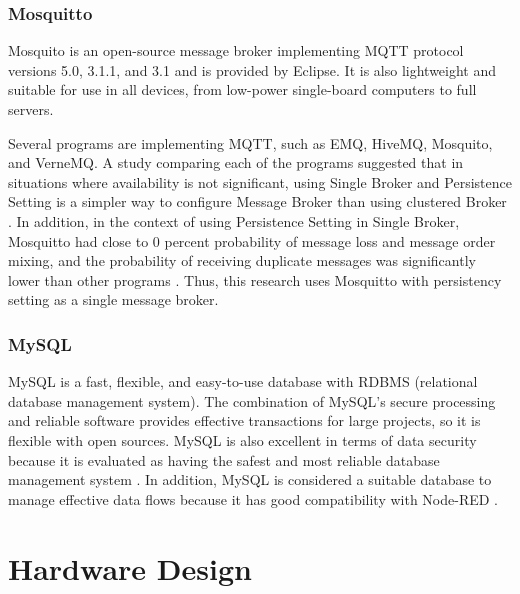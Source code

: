 \documentclass[conference]{IEEEtran}
\begin{document}
\subsubsection{Mosquitto}
Mosquito is an open-source message broker implementing MQTT protocol versions 5.0, 3.1.1, and 3.1 and is provided by Eclipse. It is also lightweight and suitable for use in all devices, from low-power single-board computers to full servers.\cite{b22}

Several programs are implementing MQTT, such as EMQ, HiveMQ, Mosquito, and VerneMQ. A study comparing each of the programs suggested that in situations where availability is not significant, using Single Broker and Persistence Setting is a simpler way to configure Message Broker than using clustered Broker \cite{b23}. In addition, in the context of using Persistence Setting in Single Broker, Mosquitto had close to 0 percent probability of message loss and message order mixing, and the probability of receiving duplicate messages was significantly lower than other programs \cite{b23}. Thus, this research uses Mosquitto with persistency setting as a single message broker.

\subsubsection{MySQL}
MySQL is a fast, flexible, and easy-to-use database with RDBMS (relational database management system). The combination of MySQL's secure processing and reliable software provides effective transactions for large projects, so it is flexible with open sources. MySQL is also excellent in terms of data security because it is evaluated as having the safest and most reliable database management system \cite{b24}. In addition, MySQL is considered a suitable database to manage effective data flows because it has good compatibility with Node-RED \cite{b24}.

\section{Hardware Design}
\end{document}
